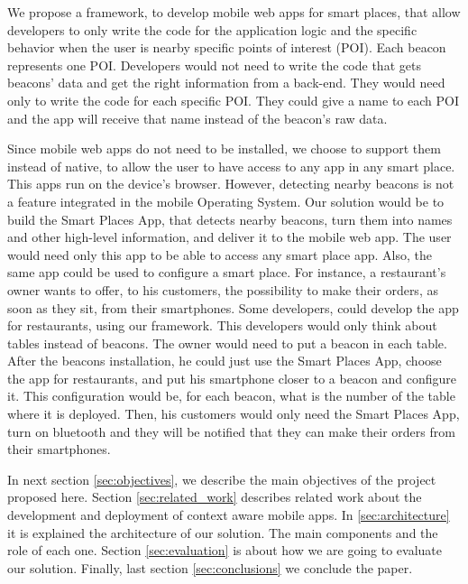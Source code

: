 We propose a framework, to develop mobile web apps for smart
places, that allow developers to only write the code
for the application logic and the specific behavior when
the user is nearby specific points of interest (POI).
Each beacon represents one POI. Developers would not need
to write the code that gets beacons' data and get the
right information from a back-end. They would need only
to write the code for each specific POI. They could give
a name to each POI and the app will receive that name 
instead of the beacon's raw data. 

Since mobile web
apps do not need to be installed, we choose to support
them instead of native, to allow
the user to have access to any app in any smart place.
This apps run on the device's browser. However, detecting
nearby beacons is not a feature integrated in the mobile
Operating System. Our solution would be to build the
Smart Places App,
that detects nearby beacons, turn them into names and
other high-level information, and deliver it to the
mobile web app. The user would need only this app to
be able to access any smart place app. Also, the same app
could be used to configure a smart place.
For instance, a restaurant's owner wants to offer, to
his customers, the possibility to make their orders,
as soon as they sit, from their smartphones. Some
developers, could develop the app for restaurants,
using our framework. This developers would only think
about tables instead of beacons. The owner would need
to put a beacon in each table. After the beacons
installation, he could just use the Smart Places App,
choose the app for restaurants, and put his smartphone
closer to a beacon and configure it. This configuration
would be, for each beacon, what is the number of the table
where it is deployed. Then, his customers would only
need the Smart Places App, turn on bluetooth and they will
be notified that they can make their orders from their
smartphones.

In next section \ref{sec:objectives}, we describe the main
objectives of the project proposed here.
Section \ref{sec:related_work} describes related
work about the development and deployment of
context aware mobile apps.
In \ref{sec:architecture} it is explained the architecture of our solution. The main components and the role of
each one.
Section \ref{sec:evaluation} is about how we are going
to evaluate our solution.
Finally, last section \ref{sec:conclusions} we conclude
the paper.
